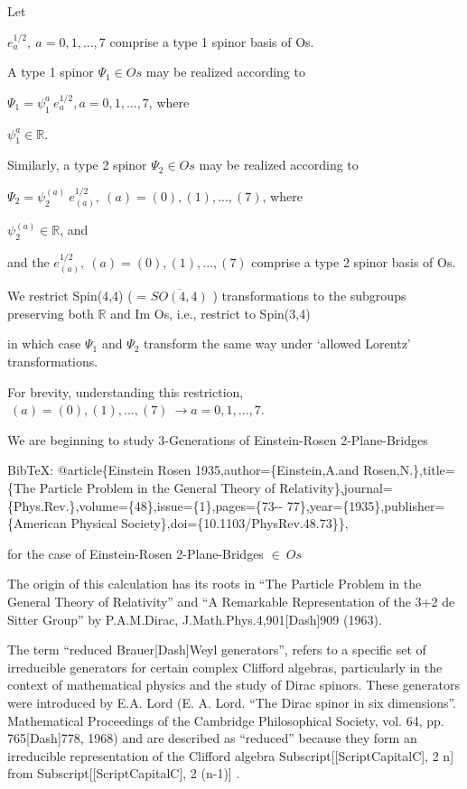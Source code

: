 \documentclass[10pt]{article}
\makeatletter
\newcommand\keepnext{\par\nopagebreak\@nobreaktrue\everypar{\@nobreakfalse\everypar{}}}
\makeatother
\begin{document}
Let\keepnext


$e^{1/2}_a, \  a=0, 1, ..., 7$ comprise a type 1 spinor basis of Os.


A type 1 spinor $\Psi_1 \in Os$ may be realized according to


$\Psi_1 = \psi_1^a \  e^{1/2}_a,  a = 0, 1, ..., 7 $, where\keepnext


$\psi_1^a \in \mathbb{R}$.\keepnext


Similarly, a type 2 spinor $\Psi_2 \in Os$ may be realized according to


$\Psi_2 = \psi_2^{(a)} \  e^{1/2}_{(a)}, \  (a) = (0), (1), ..., (7)$, where\keepnext


$\psi_2^{(a)} \in \mathbb{R}$, and\keepnext


and the $e^{1/2}_{(a)}, \  (a) = (0), (1), ..., (7)$ comprise a type 2 spinor basis of Os.




We restrict Spin(4,4) ( = $\overline{ SO(4,4) }$  ) transformations to the subgroups preserving both $\mathbb{R}$  and Im Os, i.e., restrict  to   Spin(3,4)


in which case $\Psi_1$  and  $\Psi_2$ transform the same way under `allowed Lorentz' transformations.


For brevity, understanding this restriction, $\  (a) = (0), (1), ..., (7)  \  \to a = 0, 1, ..., 7$.




We are beginning to study 3-Generations of Einstein-Rosen 2-Plane-Bridges


BibTeX: @article\{Einstein Rosen 1935,author=\{Einstein,A.and Rosen,N.\},title=\{The Particle Problem in the General Theory of Relativity\},journal=\{Phys.Rev.\},volume=\{48\},issue=\{1\},pages=\{73-{}- 77\},year=\{1935\},publisher=\{American Physical Society\},doi=\{10.1103/PhysRev.48.73\}\},


for the case of Einstein-Rosen 2-Plane-Bridges $\in \  Os$


The origin of this calculation has its roots in ``The Particle Problem in the General Theory of Relativity'' and ``A Remarkable Representation of the 3+2 de Sitter Group'' by P.A.M.Dirac, J.Math.Phys.4,901[Dash]909 (1963).


The term ``reduced Brauer[Dash]Weyl generators'',  refers to a specific set of irreducible generators for certain complex Clifford algebras, particularly in the context of mathematical physics and the study of Dirac spinors. These generators were introduced by E.A. Lord (E. A. Lord. ``The Dirac spinor in six dimensions''. Mathematical Proceedings of the Cambridge Philosophical Society, vol. 64, pp. 765[Dash]778, 1968) and are described as ``reduced'' because they form an irreducible representation of the Clifford algebra   Subscript[[ScriptCapitalC], 2 n]  from   Subscript[[ScriptCapitalC], 2 (n-1)] .
\end{document}
